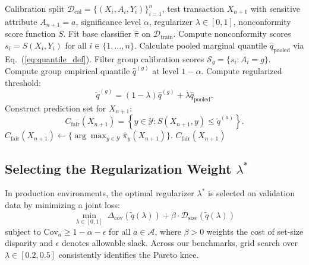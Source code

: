 \documentclass[twoside]{article}
\begin{document}
\begin{algorithm}[tb]
\caption{FairTransCP Calibration and Prediction}
\label{alg:fairtranscp}
\begin{algorithmic}[1]
\REQUIRE Calibration split $\mathcal{D}_{\text{cal}} = \{(X_i, A_i, Y_i)\}_{i=1}^n$, test transaction $X_{n+1}$ with sensitive attribute $A_{n+1} = a$, significance level $\alpha$, regularizer $\lambda \in [0, 1]$, nonconformity score function $S$.
\STATE Fit base classifier $\hat{\pi}$ on $\mathcal{D}_{\text{train}}$.
\STATE Compute nonconformity scores $s_i = S(X_i, Y_i)$ for all $i \in \{1, \dots, n\}$.
\STATE Calculate pooled marginal quantile $\hat{q}_{\text{pooled}}$ via Eq.~(\ref{eq:quantile_def}).
    \STATE Filter group calibration scores $\mathcal{S}_g = \{s_i : A_i = g\}$.
    \STATE Compute group empirical quantile $\hat{q}^{(g)}$ at level $1 - \alpha$.
    \STATE Compute regularized threshold:
    \begin{equation}
    \tilde{q}^{(g)} = (1 - \lambda) \hat{q}^{(g)} + \lambda \hat{q}_{\text{pooled}}.
    \end{equation}
\ENDFOR
\STATE Construct prediction set for $X_{n+1}$:
\begin{equation}
C_{\text{fair}}(X_{n+1}) = \left\{ y \in \mathcal{Y} : S(X_{n+1}, y) \le \tilde{q}^{(a)} \right\}.
\end{equation}
    \STATE $C_{\text{fair}}(X_{n+1}) \leftarrow \{\arg\max_{y \in \mathcal{Y}} \hat{\pi}_y(X_{n+1})\}$.
\ENDIF
\RETURN $C_{\text{fair}}(X_{n+1})$
\end{algorithmic}
\end{algorithm}

\subsection{Selecting the Regularization Weight $\lambda^*$}
In production environments, the optimal regularizer $\lambda^*$ is selected on validation data by minimizing a joint loss:
\begin{equation}
\min_{\lambda \in [0, 1]} \; \Delta_{\text{cov}}(\tilde{q}(\lambda)) + \beta \cdot \mathcal{D}_{\text{size}}(\tilde{q}(\lambda))
\end{equation}
subject to $\text{Cov}_a \ge 1 - \alpha - \epsilon$ for all $a \in \mathcal{A}$, where $\beta > 0$ weights the cost of set-size disparity and $\epsilon$ denotes allowable slack. Across our benchmarks, grid search over $\lambda \in [0.2, 0.5]$ consistently identifies the Pareto knee.
\end{document}
